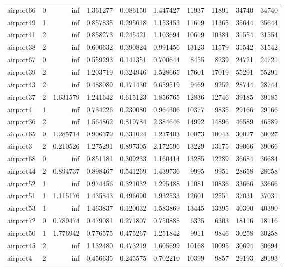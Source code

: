 \begin{longtable}{|l|r|r|r|r|r|r|r|r|r|}
airport66 & 0 & inf & 1.361277 & 0.086150 & 1.447427 & 11937 & 11891 & 34740 & 34740 \\
airport49 & 1 & inf & 0.857835 & 0.295618 & 1.153453 & 11619 & 11365 & 35644 & 35644 \\
airport41 & 2 & inf & 0.858273 & 0.245421 & 1.103694 & 10619 & 10384 & 31554 & 31554 \\
airport38 & 2 & inf & 0.600632 & 0.390824 & 0.991456 & 13123 & 11579 & 31542 & 31542 \\
airport67 & 0 & inf & 0.559293 & 0.141351 & 0.700644 & 8455 & 8239 & 24721 & 24721 \\
airport39 & 2 & inf & 1.203719 & 0.324946 & 1.528665 & 17601 & 17019 & 55291 & 55291 \\
airport43 & 2 & inf & 0.488089 & 0.171430 & 0.659519 & 9469 & 9252 & 28744 & 28744 \\
airport37 & 2 & 1.631579 & 1.241642 & 0.615123 & 1.856765 & 12836 & 12746 & 39185 & 39185 \\
airport4 & 1 & inf & 0.734226 & 0.230080 & 0.964306 & 10377 & 9835 & 29166 & 29166 \\
airport36 & 2 & inf & 1.564862 & 0.819784 & 2.384646 & 14992 & 14896 & 46589 & 46589 \\
airport65 & 0 & 1.285714 & 0.906379 & 0.331024 & 1.237403 & 10073 & 10043 & 30027 & 30027 \\
airport3 & 2 & 0.210526 & 1.275291 & 0.897305 & 2.172596 & 13229 & 13175 & 39066 & 39066 \\
airport68 & 0 & inf & 0.851181 & 0.309233 & 1.160414 & 13285 & 12289 & 36684 & 36684 \\
airport44 & 2 & 0.894737 & 0.898467 & 0.541269 & 1.439736 & 9995 & 9951 & 28658 & 28658 \\
airport52 & 1 & inf & 0.974456 & 0.321032 & 1.295488 & 11081 & 10836 & 33666 & 33666 \\
airport51 & 1 & 1.115176 & 1.435843 & 0.496690 & 1.932533 & 12601 & 12551 & 37031 & 37031 \\
airport53 & 1 & inf & 1.463837 & 0.120032 & 1.583869 & 13445 & 13395 & 40390 & 40390 \\
airport72 & 0 & 0.789474 & 0.479081 & 0.271807 & 0.750888 & 6325 & 6303 & 18116 & 18116 \\
airport50 & 1 & 1.776942 & 0.776575 & 0.475267 & 1.251842 & 9911 & 9846 & 30258 & 30258 \\
airport45 & 2 & inf & 1.132480 & 0.473219 & 1.605699 & 10168 & 10095 & 30694 & 30694 \\
airport4 & 2 & inf & 0.456635 & 0.245575 & 0.702210 & 10399 & 9857 & 29193 & 29193 \\

\end{longtable}
